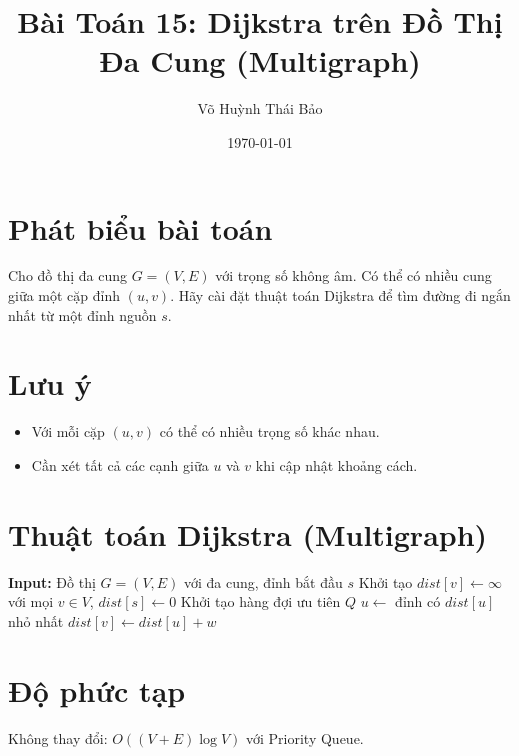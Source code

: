 \documentclass[12pt,a4paper]{article}
\title{Bài Toán 15: Dijkstra trên Đồ Thị Đa Cung (Multigraph)}
\author{Võ Huỳnh Thái Bảo}
\date{\today}
\begin{document}
\maketitle

\section*{Phát biểu bài toán}
Cho đồ thị đa cung $G = (V, E)$ với trọng số không âm. Có thể có nhiều cung giữa một cặp đỉnh $(u, v)$. Hãy cài đặt thuật toán Dijkstra để tìm đường đi ngắn nhất từ một đỉnh nguồn $s$.

\section*{Lưu ý}
\begin{itemize}
  \item Với mỗi cặp $(u, v)$ có thể có nhiều trọng số khác nhau.
  \item Cần xét tất cả các cạnh giữa $u$ và $v$ khi cập nhật khoảng cách.
\end{itemize}

\section*{Thuật toán Dijkstra (Multigraph)}
\begin{algorithmic}
\State \textbf{Input:} Đồ thị $G = (V, E)$ với đa cung, đỉnh bắt đầu $s$
\State Khởi tạo $dist[v] \gets \infty$ với mọi $v \in V$, $dist[s] \gets 0$
\State Khởi tạo hàng đợi ưu tiên $Q$
  \State $u \gets$ đỉnh có $dist[u]$ nhỏ nhất
      \State $dist[v] \gets dist[u] + w$
    \EndIf
  \EndFor
\EndWhile
\end{algorithmic}

\section*{Độ phức tạp}
Không thay đổi: $O((V + E) \log V)$ với Priority Queue.
\end{document}

